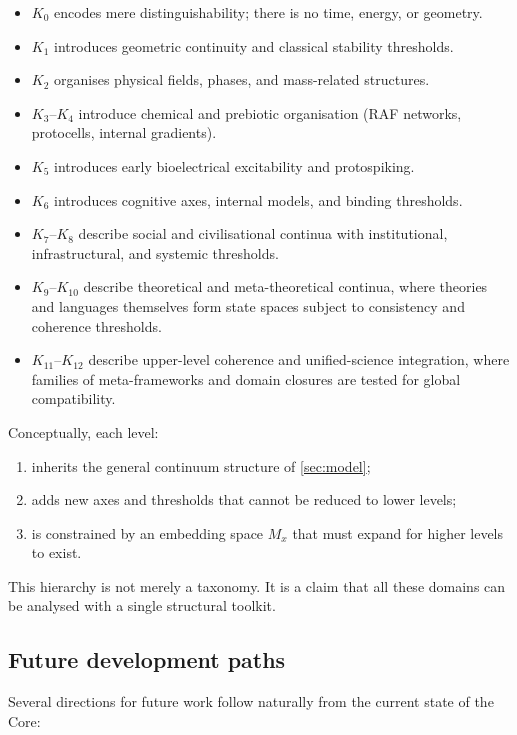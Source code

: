 \begin{itemize}
    \item \(K_0\) encodes mere distinguishability; there is no time, energy, or geometry.
    \item \(K_1\) introduces geometric continuity and classical stability thresholds.
    \item \(K_2\) organises physical fields, phases, and mass-related structures.
    \item \(K_3\)--\(K_4\) introduce chemical and prebiotic organisation (RAF networks, protocells, internal gradients).
    \item \(K_5\) introduces early bioelectrical excitability and protospiking.
    \item \(K_6\) introduces cognitive axes, internal models, and binding thresholds.
    \item \(K_7\)--\(K_8\) describe social and civilisational continua with institutional, infrastructural, and systemic thresholds.
    \item \(K_9\)--\(K_{10}\) describe theoretical and meta-theoretical continua,
          where theories and languages themselves form state spaces subject to
          consistency and coherence thresholds.
    \item \(K_{11}\)--\(K_{12}\) describe upper-level coherence and
          unified-science integration, where families of meta-frameworks and
          domain closures are tested for global compatibility.
\end{itemize}

Conceptually, each level:
\begin{enumerate}
    \item inherits the general continuum structure of \cref{sec:model};
    \item adds new axes and thresholds that cannot be reduced to lower levels;
    \item is constrained by an embedding space \(M_x\) that must expand for higher levels to exist.
\end{enumerate}
This hierarchy is not merely a taxonomy.
It is a claim that all these domains can be analysed with a single structural toolkit.

\subsection{Future development paths}

Several directions for future work follow naturally from the current state of the Core:

